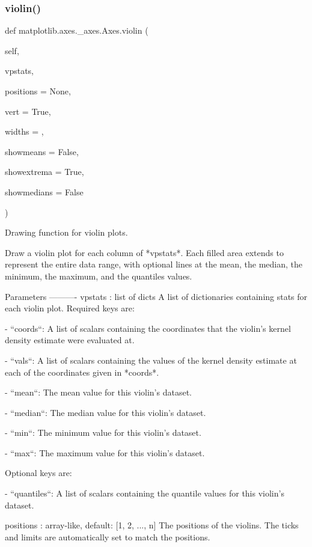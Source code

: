 \begin{DoxyVerb}
\subsubsection{\texorpdfstring{violin()}{violin()}}
{\footnotesize\ttfamily def matplotlib.\+axes.\+\_\+axes.\+Axes.\+violin (\begin{DoxyParamCaption}\item[{}]{self,  }\item[{}]{vpstats,  }\item[{}]{positions = {\ttfamily None},  }\item[{}]{vert = {\ttfamily True},  }\item[{}]{widths = {},  }\item[{}]{showmeans = {\ttfamily False},  }\item[{}]{showextrema = {\ttfamily True},  }\item[{}]{showmedians = {\ttfamily False} }\end{DoxyParamCaption})}

\begin{DoxyVerb}Drawing function for violin plots.

Draw a violin plot for each column of *vpstats*. Each filled area
extends to represent the entire data range, with optional lines at the
mean, the median, the minimum, the maximum, and the quantiles values.

Parameters
----------
vpstats : list of dicts
  A list of dictionaries containing stats for each violin plot.
  Required keys are:

  - ``coords``: A list of scalars containing the coordinates that
    the violin's kernel density estimate were evaluated at.

  - ``vals``: A list of scalars containing the values of the
    kernel density estimate at each of the coordinates given
    in *coords*.

  - ``mean``: The mean value for this violin's dataset.

  - ``median``: The median value for this violin's dataset.

  - ``min``: The minimum value for this violin's dataset.

  - ``max``: The maximum value for this violin's dataset.

  Optional keys are:

  - ``quantiles``: A list of scalars containing the quantile values
    for this violin's dataset.

positions : array-like, default: [1, 2, ..., n]
  The positions of the violins. The ticks and limits are
  automatically set to match the positions.


\end{DoxyVerb}
\end{DoxyVerb}
